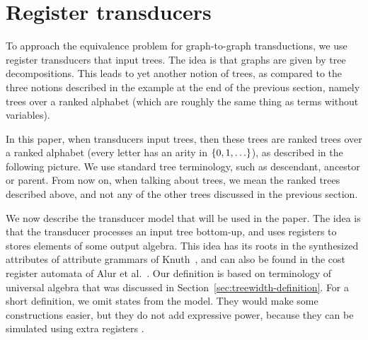 \section{Register transducers}\label{sec:register-transducers}
To approach the equivalence problem for graph-to-graph transductions, we use register transducers that input trees. The idea is that graphs are given by tree decompositions. This leads to yet another notion of trees, as compared to the three notions described in the example at the end of the previous section, namely trees over a ranked alphabet (which are roughly the same thing as terms without variables).

In this paper, when transducers input trees, then these trees are  ranked trees over a ranked alphabet (every letter has an arity in $\{0,1,\ldots\}$), as described in the following picture.
 We use standard tree terminology, such as descendant, ancestor or parent. From now on, when talking about trees, we mean the ranked trees described above, and not any of the other trees discussed in the previous section.

We now describe the transducer model that will be used in the paper. The idea is that the transducer processes an input tree bottom-up, and uses registers to stores elements of some output algebra.  This idea has its roots in the synthesized attributes of attribute grammars of Knuth~\cite{Knuth:1968aa}, and can also be found in the cost register automata of Alur et al.~\cite[p.~15]{alurDantoniDeshmukhYuan2013}. Our definition is based on  terminology of universal algebra that was discussed in Section~\ref{sec:treewidth-definition}.
For a short definition, we omit states 
from the model. They would make some constructions easier, but they do not add expressive power, because they can be simulated using extra registers
.

